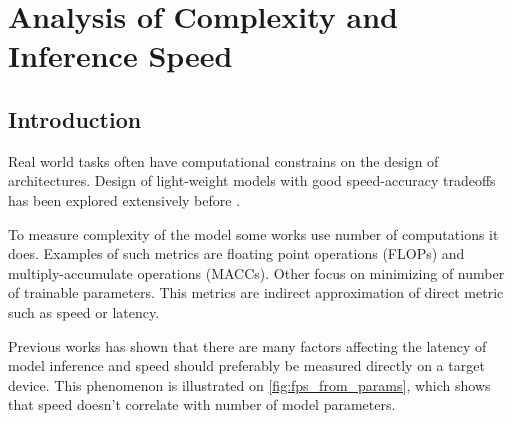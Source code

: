 \chapter{Analysis of Complexity and Inference Speed} \label{chap:speed}



\section{Introduction}



Real world tasks often have computational constrains on the design of architectures. Design of light-weight models with good speed-accuracy tradeoffs has been explored extensively before \cite{howard2017_mobilenetv1} \cite{sandler2018_mobilenetv2} \cite{ma2018_shufflenetv2} \cite{zhang2018_shufflenet}.  %

To measure complexity of the model some works use number of computations it does. Examples of such metrics are floating point operations (FLOPs) and multiply-accumulate operations (MACCs). Other focus on minimizing of number of trainable parameters. This metrics are indirect approximation of direct metric such as speed or latency. 

Previous works has shown \cite{radosavovic2020_designing} \cite{lee2020_compounding_improvements} that there are many factors affecting the latency of model inference and speed should preferably be measured directly on a target device. This phenomenon is illustrated on \autoref{fig:fps_from_params}, which shows that speed doesn't correlate with number of model parameters.   

